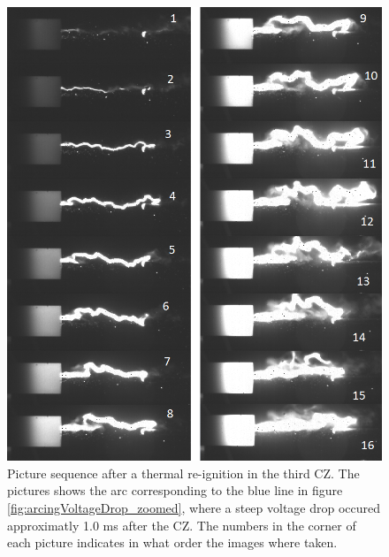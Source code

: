\documentclass[10pt,b5paper,twoside]{article}
\begin{document}
\begin{figure}[H]
\centering
\includegraphics[scale=0.67, angle =0 ]{Bilder/Results/301_23_TR_TR_drop_2.png}
\caption{Picture sequence after a thermal re-ignition in the third CZ. The pictures shows the arc corresponding to the blue line in figure \ref{fig:arcingVoltageDrop_zoomed}, where a steep voltage drop occured approximatly 1.0 ms after the CZ. The numbers in the corner of each picture indicates in what order the images where taken.} \label{fig:arcingVoltage_drop_301_blue_2}
\end{figure}

%
\end{document}
